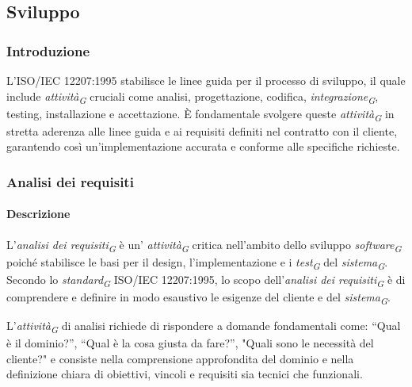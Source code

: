 \subsection{Sviluppo}

\subsubsection{Introduzione}
L'ISO/IEC 12207:1995 stabilisce le linee guida per il processo di sviluppo, il quale include \textit{attività}\textsubscript{\textit{G}} cruciali come analisi, progettazione, codifica, \textit{integrazione}\textsubscript{\textit{G}}, testing, installazione e accettazione. È fondamentale svolgere queste \textit{attività}\textsubscript{\textit{G}} in stretta aderenza alle linee guida e ai requisiti definiti nel contratto con il cliente, garantendo così un'implementazione accurata e conforme alle specifiche richieste.

\subsubsection{Analisi dei requisiti}
\paragraph{Descrizione}
L'\textit{analisi dei requisiti}\textsubscript{\textit{G}} è un' \textit{attività}\textsubscript{\textit{G}} critica nell'ambito dello sviluppo \textit{software}\textsubscript{\textit{G}} poiché stabilisce le basi per il design, l'implementazione e i \textit{test}\textsubscript{\textit{G}} del \textit{sistema}\textsubscript{\textit{G}}. \\
Secondo lo \textit{standard}\textsubscript{\textit{G}} ISO/IEC 12207:1995, lo scopo dell'\textit{analisi dei requisiti}\textsubscript{\textit{G}} è di comprendere e definire in modo esaustivo le esigenze del cliente e del \textit{sistema}\textsubscript{\textit{G}}.

\vspace{0.2cm}

L’\textit{attività}\textsubscript{\textit{G}} di analisi richiede di rispondere a domande fondamentali come: “Qual è il dominio?”, “Qual è la cosa giusta da fare?”, "Quali sono le necessità del cliente?" e consiste nella comprensione approfondita del dominio e nella definizione chiara di obiettivi, vincoli e requisiti sia tecnici che funzionali.

